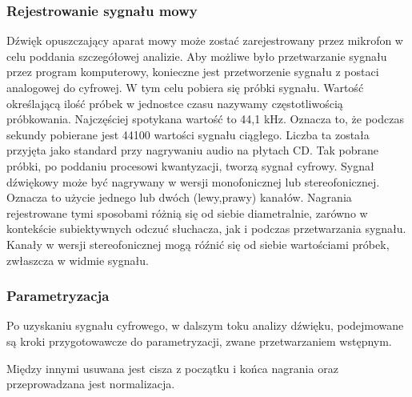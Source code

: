 \documentclass[a4paper,12 pt]{article}
\begin{document}
\subsubsection{Rejestrowanie sygnału mowy}

Dźwięk opuszczający aparat mowy może zostać zarejestrowany przez mikrofon w celu poddania szczegółowej analizie. Aby możliwe było przetwarzanie sygnału przez program komputerowy, konieczne jest przetworzenie sygnału z postaci analogowej do cyfrowej. W tym celu pobiera się próbki sygnału. Wartość określającą ilość próbek w jednostce czasu nazywamy częstotliwością próbkowania. Najczęściej spotykana wartość to 44,1 kHz. Oznacza to, że podczas sekundy pobierane jest 44100 wartości sygnału ciągłego. Liczba ta została przyjęta jako standard przy nagrywaniu audio na płytach CD. Tak pobrane próbki, po poddaniu procesowi kwantyzacji, tworzą sygnał cyfrowy.
Sygnał dźwiękowy może być nagrywany w wersji monofonicznej lub stereofonicznej. Oznacza to użycie jednego lub dwóch (lewy,prawy) kanałów. Nagrania rejestrowane tymi sposobami różnią się od siebie diametralnie, zarówno w kontekście subiektywnych odczuć słuchacza, jak i podczas przetwarzania sygnału. Kanały w wersji stereofonicznej mogą róźnić się od siebie wartościami próbek, zwłaszcza w widmie sygnału.

\subsubsection{Parametryzacja}

Po uzyskaniu sygnału cyfrowego, w dalszym toku analizy dźwięku, podejmowane są kroki przygotowawcze do parametryzacji, zwane przetwarzaniem wstępnym. 




Między innymi usuwana jest cisza z początku i końca nagrania oraz przeprowadzana jest normalizacja. 
\end{document}
